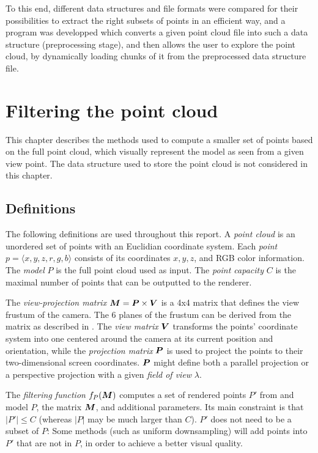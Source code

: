 \documentclass[a4paper,11pt,abstracton,notitlepage]{scrreprt}
\begin{document}
To this end, different data structures and file formats were compared for their possibilities to extract the right subsets of points in an efficient way, and a program was developped which converts a given point cloud file into such a data structure (preprocessing stage), and then allows the user to explore the point cloud, by dynamically loading chunks of it from the preprocessed data structure file.


\chapter{Filtering the point cloud}
This chapter describes the methods used to compute a smaller set of points based on the full point cloud, which visually represent the model as seen from a given view point. The data structure used to store the point cloud is not considered in this chapter.

\section{Definitions}
The following definitions are used throughout this report. A \emph{point cloud} is an unordered set of points with an Euclidian coordinate system. Each \emph{point} $p = \langle x, y, z, r, g, b\rangle$ consists of its coordinates $x, y, z$, and RGB color information. The \emph{model} $P$ is the full point cloud used as input. The \emph{point capacity} $C$ is the maximal number of points that can be outputted to the renderer. 

The \emph{view-projection matrix} $\matrixsym{M} = \matrixsym{P} \times \matrixsym{V}$ is a 4x4 matrix that defines the view frustum of the camera. The 6 planes of the frustum can be derived from the matrix as described in \cite{Gri2001}. The \emph{view matrix} $\matrixsym{V}$ transforms the points' coordinate system into one centered around the camera at its current position and orientation, while the \emph{projection matrix} $\matrixsym{P}$ is used to project the points to their two-dimensional screen coordinates. $\matrixsym{P}$ might define both a parallel projection or a perspective projection with a given \emph{field of view} $\lambda$.

The \emph{filtering function} $f_{P}(\matrixsym{M})$ computes a set of rendered points $P'$ from and model $P$, the matrix $\matrixsym{M}$, and additional parameters. Its main constraint is that $|P'| \leq C$ (whereas $|P|$ may be much larger than $C$). $P'$ does not need to be a subset of $P$: Some methods (such as uniform downsampling) will add points into $P'$ that are not in $P$, in order to achieve a better visual quality.
\end{document}
